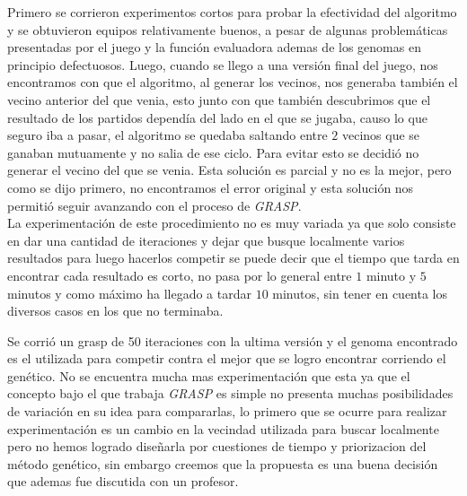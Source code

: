 Primero se corrieron experimentos cortos para probar la efectividad del algoritmo y se obtuvieron equipos relativamente buenos,
a pesar de algunas problemáticas presentadas por el juego y la función evaluadora ademas de los genomas en principio defectuosos.
Luego, cuando se llego a una versión final del juego, nos encontramos con que el algoritmo, al generar los vecinos, nos generaba también
el vecino anterior del que venia, esto junto con que también descubrimos que el resultado de los partidos dependía del lado en el
que se jugaba, causo lo que seguro iba a pasar, el algoritmo se quedaba saltando entre $2$ vecinos que se ganaban mutuamente y no
salia de ese ciclo.
Para evitar esto se decidió no generar el vecino del que se venia. Esta solución es parcial y no es la mejor, pero como se dijo primero,
no encontramos el error original y esta solución nos permitió seguir avanzando con el proceso de \emph{GRASP}.\\

La experimentación de este procedimiento no es muy variada ya que solo consiste en dar una cantidad de iteraciones y dejar que
busque localmente varios resultados para luego hacerlos competir se puede decir que el tiempo que tarda en encontrar
cada resultado es corto, no pasa por lo general entre $1$ minuto y $5$ minutos y como máximo ha llegado a tardar $10$ minutos, sin tener en cuenta
los diversos casos en los que no terminaba.


Se corrió un grasp de 50 iteraciones con la ultima versión y el genoma encontrado es el utilizada para competir contra el mejor que se logro encontrar
corriendo el genético. No se encuentra mucha mas experimentación que esta ya que el concepto bajo el que trabaja \emph{GRASP}
es simple no presenta muchas posibilidades de variación en su idea para compararlas, lo primero que se ocurre para realizar
experimentación es un cambio en la vecindad utilizada para buscar localmente pero no hemos logrado diseñarla por cuestiones
de tiempo y priorizacion del método genético, sin embargo
creemos que la propuesta es una buena decisión que ademas fue discutida con un profesor.
